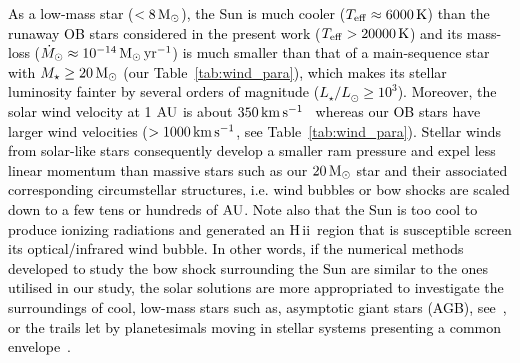 \documentclass[useAMS,usenatbib]{mn2e}
\newcommand\hii{H\,{\sc ii} \,}
\begin{document}
\textcolor{black}{ 
As a low-mass star ($<8\, \rm M_{\odot}$), the Sun is much cooler ($T_{\rm eff}\approx 6000\, \rm K$) 
than the runaway OB stars considered in the present work ($T_{\rm eff} > 
20000\, \rm K$) and its mass-loss ($\dot{M}_{\odot}\approx 10^{-14}\, \rm M_{\odot}\, 
\rm yr^{-1}$) is much smaller than that of a main-sequence star with 
$M_{\star} \ge 20\, \rm M_{\odot}$ (our Table~\ref{tab:wind_para}), 
which makes its stellar luminosity fainter by several orders of magnitude 
($L_{\star}/L_{\odot} \ge 10^{3}$). Moreover, the solar wind velocity at 
1 $\rm AU$ is about $350\, \rm km\, \rm s^{-1}$~\citep{golub_1997} 
whereas our OB stars have larger wind velocities ($>1000\, \rm km\, 
\rm s^{-1}$, see Table~\ref{tab:wind_para}). 
Stellar winds from solar-like stars consequently develop a smaller ram pressure 
and expel less linear momentum than massive stars such as our $20\, \rm 
M_{\odot}$ star and their associated corresponding circumstellar structures, i.e. wind 
bubbles or bow shocks are scaled down to a few tens or hundreds of $\rm AU$. 
Note also that the Sun is too cool to produce ionizing radiations and generated 
an \hii region that is susceptible screen its optical/infrared wind bubble. In other 
words, if the numerical methods developed 
to study the bow shock surrounding the Sun are similar to the ones utilised in 
our study, the solar solutions are more appropriated to investigate the surroundings 
of cool, low-mass stars such as, asymptotic giant stars (AGB), see~\citep{wareing_apj_660_2007, 
WareingZijlstraOBrien_2007_MNRAS_382_1233_AGB_bowshocks,raga_apj_680_2008,
esquivel_apj_725_2010,villaver_apj_748_2012,chiotellis_mnras_547_2016}, 
or the trails let by planetesimals moving in stellar systems presenting a common 
envelope~\citep[see][and references therein]{thun_aa_589_2016}. 
}
\end{document}
